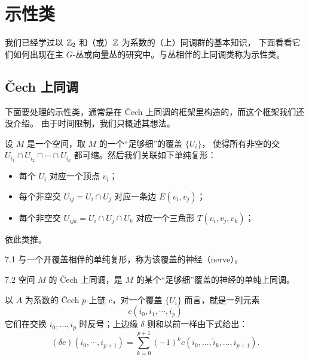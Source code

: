
\chapter{示性类}

我们已经学过以 $\mathbb{Z}_2$ 和（或）$\mathbb{Z}$ 为系数的（上）同调群的基本知识，
下面看看它们如何出现在主 $G$-丛或向量丛的研究中。与丛相伴的上同调类称为示性类。

\section{Čech 上同调}

下面要处理的示性类，通常是在 Čech 上同调的框架里构造的，而这个框架我们还没介绍。
由于时间限制，我们只概述其想法。

设 $M$ 是一个空间，取 $M$ 的一个“足够细”的覆盖 $\{U_i\}$，
使得所有非空的交 $U_{i_1}\cap U_{i_2}\cap\cdots\cap U_{i_k}$ 都可缩。然后我们关联如下单纯复形：
\begin{itemize}
  \item 每个 $U_i$ 对应一个顶点 $v_i$；
  \item 每个非空交 $U_{ij}=U_i\cap U_j$ 对应一条边 $E(v_i,v_j)$；
  \item 每个非空交 $U_{ijk}=U_i\cap U_j\cap U_k$ 对应一个三角形 $T(v_i,v_j,v_k)$；
\end{itemize}
依此类推。

\begin{definition}{7.1}
与一个开覆盖相伴的单纯复形，称为该覆盖的神经（nerve）。
\end{definition}

\begin{definition}{7.2}
空间 $M$ 的 Čech 上同调，是 $M$ 的某个“足够细”覆盖的神经的单纯上同调。
\end{definition}

以 $A$ 为系数的 Čech $p$-上链 $c$，对一个覆盖 $\{U_i\}$ 而言，就是一列元素
\begin{equation}
c(i_0,i_1,\cdots,i_p)
\tag{7.1}
\end{equation}
它们在交换 $i_0,\dots,i_p$ 时反号；上边缘 $\delta$ 则和以前一样由下式给出：
\begin{equation}
(\delta c)(i_0,\cdots,i_{p+1})=\sum_{k=0}^{p+1}(-1)^k c(i_0,\dots,\hat{i}_k,\dots,i_{p+1}).
\tag{7.2}
\end{equation}

